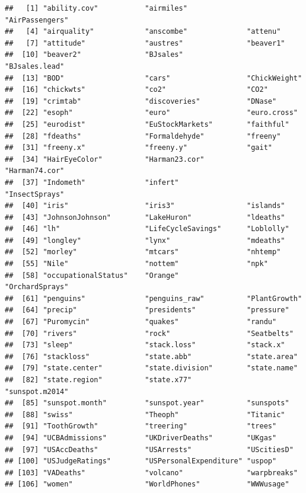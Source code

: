 \documentclass[
]{book}
\begin{document}
\begin{verbatim}
##   [1] "ability.cov"           "airmiles"              "AirPassengers"        
##   [4] "airquality"            "anscombe"              "attenu"               
##   [7] "attitude"              "austres"               "beaver1"              
##  [10] "beaver2"               "BJsales"               "BJsales.lead"         
##  [13] "BOD"                   "cars"                  "ChickWeight"          
##  [16] "chickwts"              "co2"                   "CO2"                  
##  [19] "crimtab"               "discoveries"           "DNase"                
##  [22] "esoph"                 "euro"                  "euro.cross"           
##  [25] "eurodist"              "EuStockMarkets"        "faithful"             
##  [28] "fdeaths"               "Formaldehyde"          "freeny"               
##  [31] "freeny.x"              "freeny.y"              "gait"                 
##  [34] "HairEyeColor"          "Harman23.cor"          "Harman74.cor"         
##  [37] "Indometh"              "infert"                "InsectSprays"         
##  [40] "iris"                  "iris3"                 "islands"              
##  [43] "JohnsonJohnson"        "LakeHuron"             "ldeaths"              
##  [46] "lh"                    "LifeCycleSavings"      "Loblolly"             
##  [49] "longley"               "lynx"                  "mdeaths"              
##  [52] "morley"                "mtcars"                "nhtemp"               
##  [55] "Nile"                  "nottem"                "npk"                  
##  [58] "occupationalStatus"    "Orange"                "OrchardSprays"        
##  [61] "penguins"              "penguins_raw"          "PlantGrowth"          
##  [64] "precip"                "presidents"            "pressure"             
##  [67] "Puromycin"             "quakes"                "randu"                
##  [70] "rivers"                "rock"                  "Seatbelts"            
##  [73] "sleep"                 "stack.loss"            "stack.x"              
##  [76] "stackloss"             "state.abb"             "state.area"           
##  [79] "state.center"          "state.division"        "state.name"           
##  [82] "state.region"          "state.x77"             "sunspot.m2014"        
##  [85] "sunspot.month"         "sunspot.year"          "sunspots"             
##  [88] "swiss"                 "Theoph"                "Titanic"              
##  [91] "ToothGrowth"           "treering"              "trees"                
##  [94] "UCBAdmissions"         "UKDriverDeaths"        "UKgas"                
##  [97] "USAccDeaths"           "USArrests"             "UScitiesD"            
## [100] "USJudgeRatings"        "USPersonalExpenditure" "uspop"                
## [103] "VADeaths"              "volcano"               "warpbreaks"           
## [106] "women"                 "WorldPhones"           "WWWusage"
\end{verbatim}
\end{document}
